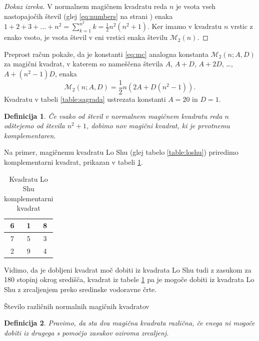 \documentclass[a4paper,12pt]{article}
\newtheorem{definicija}{Definicija}
\newcommand{\m}{\mathcal{M}_2}
\newcommand{\pojem}[1]{\emph{\color{purple}#1}}
\newenvironment{dokaz}{\begin{proof}[Dokaz izreka]}{\end{proof}}
\newenvironment{magic}[3]
   {\begin{table}[h]
      \caption{#2}
      \label{#3}
      \large
      \centering
      \begin{tabular}{|*{#1}{c|}}
         \hline
   }
      {
      \end{tabular}
      \end{table}
      }
\begin{document}
\begin{dokaz}
   V normalnem magičnem kvadratu reda $n$ je vsota vseh nastopajočih
   števil (glej \eqref{eq:numbers} na strani \pageref{eq:numbers}) enaka
   $1+2+3+\dots+n^2=\sum_{k=1}^{n^2}k=\frac{1}{2}n^2(n^2+1)$. Ker imamo
   v kvadratu $n$ vrstic z enako vsoto, je vsota števil v eni vrstici
   enaka številu $\m(n)$. %
\end{dokaz}

Preprost račun pokaže, da je konstanti \eqref{eq:mc} analogna konstanta
$\m(n;A,D)$ za magični kvadrat, v katerem so nameščena števila
$A$, $A+D$, $A+2D$, \dots, $A+(n^2-1)D$, enaka %
$$\m(n;A,D)=\frac{1}{2}n(2A+D(n^2-1)).$$
Kvadratu v tabeli \ref{table:sagrada} ustrezata konstanti $A=20$ in $D=1$.

\begin{definicija}
      Če vsako od števil v normalnem magičnem kvadratu reda $n$ odštejemo
      od števila $n^2+1$, dobimo nov magični kvadrat, ki je prvotnemu
      \pojem{komplementaren}.
\end{definicija}

Na primer, magičnemu kvadratu Lo Shu (glej tabelo \ref{table:loshu}) priredimo
komplementarni kvadrat, prikazan v tabeli \ref{table:closhu}.
%
\begin{magic}{3}{Kvadratu Lo Shu komplementarni kvadrat}{table:closhu}
   6 & 1 & 8 \\\hline
   7 & 5 & 3 \\\hline
   2 & 9 & 4 \\\hline
\end{magic}

Vidimo, da je dobljeni kvadrat moč dobiti iz kvadrata Lo Shu tudi z zasukom za
180 stopinj okrog središča, kvadrat iz tabele \ref{table:closhu} pa je mogoče dobiti
iz kvadrata Lo Shu z zrcaljenjem preko sredinske vodoravne črte.

Število različnih normalnih magičnih kvadratov

\begin{definicija}
      Pravimo, da sta dva magična kvadrata \pojem{različna}, če enega ni mogoče dobiti
      iz drugega s pomočjo zasukov oziroma zrcaljenj.
\end{definicija}
\end{document}

